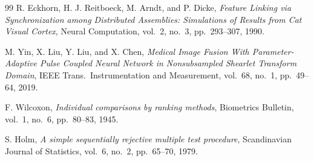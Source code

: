 \documentclass[12pt,a4paper]{article}
\begin{document}
\begin{thebibliography}{99}
R. Eckhorn, H. J. Reitboeck, M. Arndt, and P. Dicke, \emph{Feature Linking via Synchronization among Distributed Assemblies: Simulations of Results from Cat Visual Cortex}, Neural Computation, vol.\ 2, no.\ 3, pp.\ 293--307, 1990.

M. Yin, X. Liu, Y. Liu, and X. Chen, \emph{Medical Image Fusion With Parameter-Adaptive Pulse Coupled Neural Network in Nonsubsampled Shearlet Transform Domain}, IEEE Trans.\ Instrumentation and Measurement, vol.\ 68, no.\ 1, pp.\ 49--64, 2019.

F. Wilcoxon, \emph{Individual comparisons by ranking methods}, Biometrics Bulletin, vol.\ 1, no.\ 6, pp.\ 80--83, 1945.

S. Holm, \emph{A simple sequentially rejective multiple test procedure}, Scandinavian Journal of Statistics, vol.\ 6, no.\ 2, pp.\ 65--70, 1979.

\end{thebibliography}
\end{document}
